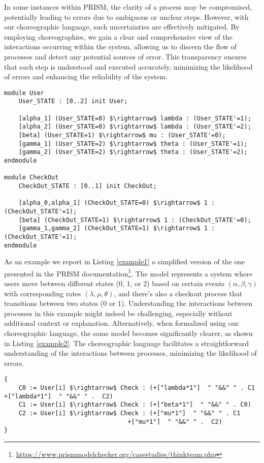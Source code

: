 
In some instances within PRISM, the clarity of a process may be compromised, potentially leading to errors due to ambiguous or unclear steps. However, with our choreographic language, such uncertainties are effectively mitigated. By employing choreographies, we gain a clear and comprehensive view of the interactions occurring within the system, allowing us to discern the flow of processes and detect any potential sources of error. This transparency ensures that each step is understood and executed accurately, minimizing the likelihood of errors and enhancing the reliability of the system.
\begin{lstlisting}[style=prism-color,caption={A PRISM example},captionpos=b,label={example1}]
module User
	User_STATE : [0..2] init User;

	[alpha_1] (User_STATE=0) $\rightarrow$ lambda : (User_STATE'=1);
	[alpha_2] (User_STATE=0) $\rightarrow$ lambda : (User_STATE'=2);
	[beta] (User_STATE=1) $\rightarrow$ mu : (User_STATE'=0);
	[gamma_1] (User_STATE=2) $\rightarrow$ theta : (User_STATE'=1);
	[gamma_2] (User_STATE=2) $\rightarrow$ theta : (User_STATE'=2);
endmodule

module CheckOut
	CheckOut_STATE : [0..1] init CheckOut;

	[alpha_0,alpha_1] (CheckOut_STATE=0) $\rightarrow$ 1 : (CheckOut_STATE'=1);
	[beta] (CheckOut_STATE=1) $\rightarrow$ 1 : (CheckOut_STATE'=0);
	[gamma_1,gamma_2] (CheckOut_STATE=1) $\rightarrow$ 1 : (CheckOut_STATE'=1);
endmodule
\end{lstlisting}

As an example we report in Listing \ref{example1} a simplified version of the one presented in the PRISM documentation\footnote{\url{https://www.prismmodelchecker.org/casestudies/thinkteam.php}}. The model represents a system where users move between different states (0, 1, or 2) based on certain events $(\alpha, \beta, \gamma)$ with corresponding rates $(\lambda, \mu, \theta)$, and there's also a checkout process that transitions between two states (0 or 1).
Understanding the interactions between processes in this example might indeed be challenging, especially without additional context or explanation. 
Alternatively, when formalized using our choreographic language, the same model becomes significantly clearer, as shown in Listing \ref{example2}. The choreographic language facilitates a straightforward understanding of the interactions between processes, minimizing the likelihood of errors.

\begin{lstlisting}[style=chor-color,caption={Example of Listing \ref{example1} in our choreographic language},captionpos=b,label={example2}]
{
    C0 := User[i] $\rightarrow$ Check : (+["lambda*1"]  " "&&" " . C1								+["lambda*1"]  " "&&" " .  C2)
    C1 := User[i] $\rightarrow$ Check : (+["beta*1"]  " "&&" " . C0)  
    C2 := User[i] $\rightarrow$ Check : (+["mu*1"]  " "&&" " . C1
                                  +["mu*1"]  " "&&" " .  C2)
}
\end{lstlisting}



